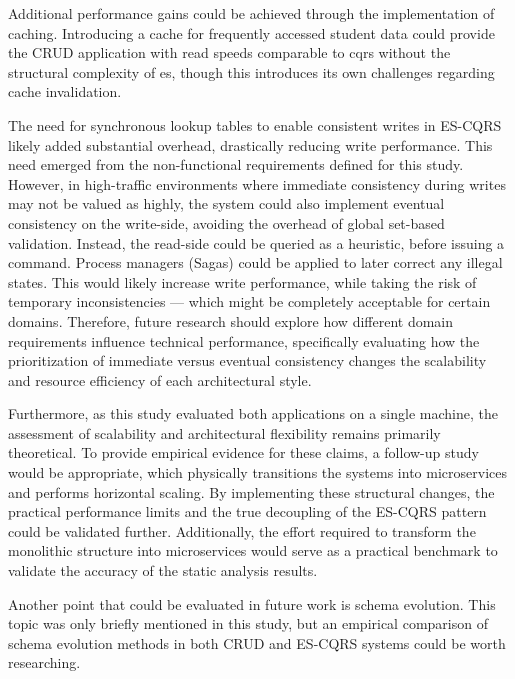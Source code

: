
Additional performance gains could be achieved through the implementation of caching. Introducing a cache for frequently accessed student data could provide the CRUD application with read speeds comparable to \gls{cqrs} without the structural complexity of \acrlong{es}, though this introduces its own challenges regarding cache invalidation.

The need for synchronous lookup tables to enable consistent writes in ES-CQRS likely added substantial overhead, drastically reducing write performance. This need emerged from the non-functional requirements defined for this study. However, in high-traffic environments where immediate consistency during writes may not be valued as highly, the system could also implement eventual consistency on the write-side, avoiding the overhead of global set-based validation. Instead, the read-side could be queried as a heuristic, before issuing a command. Process managers (Sagas) could be applied to later correct any illegal states. This would likely increase write performance, while taking the risk of temporary inconsistencies --- which might be completely acceptable for certain domains. Therefore, future research should explore how different domain requirements influence technical performance, specifically evaluating how the prioritization of immediate versus eventual consistency changes the scalability and resource efficiency of each architectural style.

Furthermore, as this study evaluated both applications on a single machine, the assessment of scalability and architectural flexibility remains primarily theoretical. To provide empirical evidence for these claims, a follow-up study would be appropriate, which physically transitions the systems into microservices and performs horizontal scaling. By implementing these structural changes, the practical performance limits and the true decoupling of the ES-CQRS pattern could be validated further. Additionally, the effort required to transform the monolithic structure into microservices would serve as a practical benchmark to validate the accuracy of the static analysis results.

Another point that could be evaluated in future work is schema evolution. This topic was only briefly mentioned in this study, but an empirical comparison of schema evolution methods in both CRUD and ES-CQRS systems could be worth researching.
